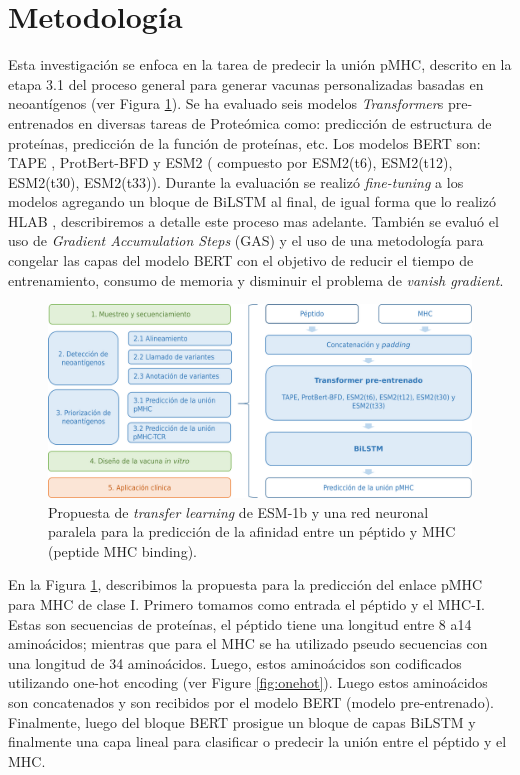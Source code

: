 \section{Metodología}

Esta investigación se  enfoca en la tarea de predecir la unión pMHC, descrito en la etapa 3.1 del proceso general para generar vacunas personalizadas basadas en neoantígenos (ver Figura \ref{fig:proposal}). Se ha evaluado  seis modelos \textit{Transformer}s pre-entrenados en diversas tareas de Proteómica como: predicción de estructura de proteínas, predicción de la función de proteínas, etc. Los modelos BERT son: TAPE \citep{rao2019evaluating}, ProtBert-BFD \citep{elnaggar2021prottrans} y ESM2 \citep{lin2023evolutionary} ( compuesto por ESM2(t6), ESM2(t12), ESM2(t30), ESM2(t33)). Durante la evaluación se realizó \textit{fine-tuning} a los modelos agregando un bloque de BiLSTM al final, de igual forma que lo realizó HLAB \citep{zhang2022hlab}, describiremos a detalle este proceso mas adelante. También se evaluó el uso de \textit{Gradient Accumulation Steps} (GAS) y el uso de una metodología para congelar las capas del modelo BERT con el objetivo de reducir el tiempo de entrenamiento, consumo de memoria y disminuir el problema de \textit{vanish gradient}. 






\begin{figure}[H]
	\centering
	\includegraphics[width=\textwidth]{../img/proposal/proposal}	
	\caption{Propuesta de \textit{transfer learning} de ESM-1b y una red neuronal paralela para la predicción de la afinidad entre un péptido y MHC (peptide MHC binding).}
	\label{fig:proposal}
\end{figure}

En la Figura \ref{fig:proposal}, describimos la propuesta para la predicción del enlace pMHC para MHC de clase I. Primero tomamos como entrada el péptido y el MHC-I. Estas son secuencias de proteínas, el péptido tiene una longitud entre 8 a14 aminoácidos; mientras que para el MHC se ha utilizado pseudo secuencias con una longitud de 34 aminoácidos. Luego, estos aminoácidos son codificados utilizando one-hot encoding (ver Figure \ref{fig:onehot}). Luego estos aminoácidos son concatenados y son recibidos por el modelo BERT (modelo pre-entrenado). Finalmente, luego del bloque BERT prosigue un bloque de capas BiLSTM y finalmente una capa lineal para clasificar o predecir la unión entre el péptido y el MHC.

